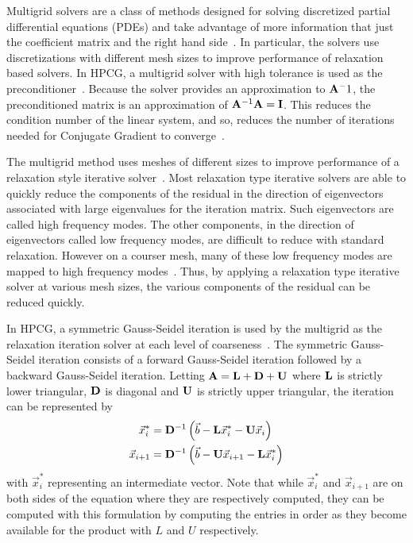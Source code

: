 Multigrid solvers are a class of methods designed for solving discretized partial differential equations (PDEs) and take advantage of more information that just the coefficient matrix and the right hand side~\cite{Saad:2003:IterativeMethods}.
In particular, the solvers use discretizations with different mesh sizes to improve performance of relaxation based solvers.
In HPCG, a multigrid solver with high tolerance is used as the preconditioner~\cite{Dongarra:2015:HPCG}.
Because the solver provides an approximation to \(\mathbf{A}^-1\), the preconditioned matrix is an approximation of \(\mathbf{A}^{-1}\mathbf{A} = \mathbf{I}\).
This reduces the condition number of the linear system, and so, reduces the number of iterations needed for Conjugate Gradient to converge~\cite{Saad:2003:IterativeMethods}.

The multigrid method uses meshes of different sizes to improve performance of a relaxation style iterative solver~\cite{Saad:2003:IterativeMethods}.
Most relaxation type iterative solvers are able to quickly reduce the components of the residual in the direction of eigenvectors associated with large eigenvalues for the iteration matrix.
Such eigenvectors are called high frequency modes.
The other components, in the direction of eigenvectors called low frequency modes, are difficult to reduce with standard relaxation.
However on a courser mesh, many of these low frequency modes are mapped to high frequency modes~\cite{Saad:2003:IterativeMethods}.
Thus, by applying a relaxation type iterative solver at various mesh sizes, the various components of the residual can be reduced quickly.

In HPCG, a symmetric Gauss-Seidel iteration is used by the multigrid as the relaxation iteration solver at each level of coarseness~\cite{Dongarra:2015:HPCG}.
The symmetric Gauss-Seidel iteration consists of a forward Gauss-Seidel iteration followed by a backward Gauss-Seidel iteration.
Letting \(\mathbf{A} = \mathbf{L}+\mathbf{D}+\mathbf{U}\) where \(\mathbf{L}\) is strictly lower triangular, \(\mathbf{D}\) is diagonal and \(\mathbf{U}\) is strictly upper triangular, the iteration can be represented by
\begin{align*}
	\vec{x}^*_i   &= \mathbf{D}^{-1}\left(\vec{b} - \mathbf{L}\vec{x}^*_i - \mathbf{U}\vec{x}_i\right) \\
	\vec{x}_{i+1} &= \mathbf{D}^{-1}\left(\vec{b} - \mathbf{U}\vec{x}_{i+1} - \mathbf{L}\vec{x}^*_i\right)
\end{align*}
with \(\vec{x}_i^*\) representing an intermediate vector.
Note that while \(\vec{x}^*_i\) and \(\vec{x}_{i+1}\) are on both sides of the equation where they are respectively computed, they can be computed with this formulation by computing the entries in order as they become available for the product with \(L\) and \(U\) respectively.
